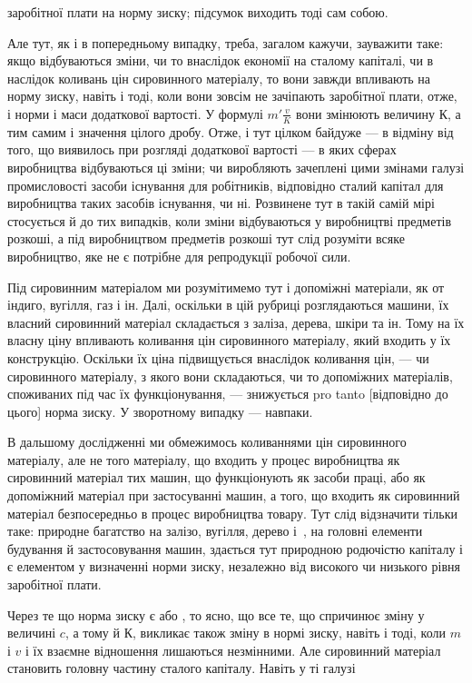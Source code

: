 \parcont{}  %
заробітної плати на норму зиску; підсумок виходить тоді сам
собою.

Але тут, як і в попередньому випадку, треба, загалом кажучи, зауважити таке: якщо відбуваються
зміни, чи то внаслідок економії на сталому капіталі, чи в наслідок коливань цін сировинного
матеріалу, то вони завжди впливають на норму
зиску, навіть і тоді, коли вони зовсім не зачіпають заробітної плати, отже, і норми і маси
додаткової вартості. У формулі $m' \frac{v}{K}$ вони змінюють величину $К$, а тим самим і значення цілого дробу.
Отже, і тут цілком байдуже — в відміну від того, що виявилось при розгляді додаткової вартості — в
яких сферах виробництва відбуваються ці зміни; чи виробляють зачеплені цими змінами галузі
промисловості засоби існування для робітників,
відповідно сталий капітал для виробництва таких засобів існування, чи ні. Розвинене тут в такій
самій мірі стосується й до
тих випадків, коли зміни відбуваються у виробництві предметів
розкоші, а під виробництвом предметів розкоші тут слід розуміти всяке виробництво, яке не є потрібне
для репродукції робочої сили.

Під сировинним матеріалом ми розумітимемо тут і допоміжні
матеріали, як от індиго, вугілля, газ і ін. Далі, оскільки в цій
рубриці розглядаються машини, їх власний сировинний матеріал
складається з заліза, дерева, шкіри та ін. Тому на їх власну
ціну впливають коливання цін сировинного матеріалу, який входить у їх конструкцію. Оскільки їх ціна
підвищується внаслідок коливання цін, — чи сировинного матеріалу, з якого вони складаються, чи то
допоміжних матеріалів, споживаних під час
їх функціонування, — знижується pro tanto [відповідно до цього]
норма зиску. У зворотному випадку — навпаки.

В дальшому дослідженні ми обмежимось коливаннями цін сировинного матеріалу, але не того матеріалу,
що входить у процес виробництва як сировинний матеріал тих машин, що функціонують як засоби праці,
або як допоміжний матеріал при застосуванні машин, а того, що входить як сировинний матеріал
безпосередньо в процес виробництва товару. Тут слід відзначити тільки таке: природне багатство на
залізо, вугілля, дерево
і~, на головні елементи будування й застосовування машин,
здається тут природною родючістю капіталу і є елементом
у визначенні норми зиску, незалежно від високого чи низького
рівня заробітної плати.

Через те що норма зиску є  або \deq{} , то ясно, що все те, що спричинює
зміну у величині $c$, а тому й $К$, викликає
також зміну в нормі зиску, навіть і тоді, коли $m$ і $v$ і їх взаємне
відношення лишаються незмінними. Але сировинний матеріал
становить головну частину сталого капіталу. Навіть у ті галузі
\parbreak{}  %
